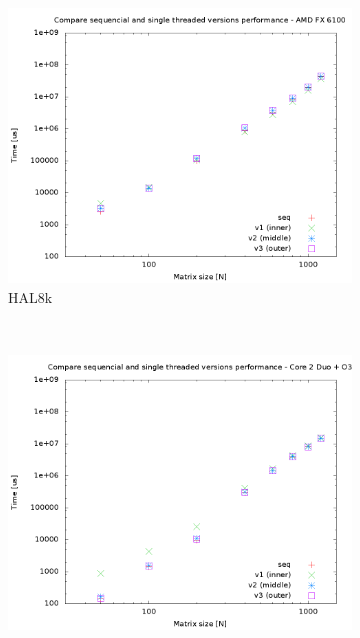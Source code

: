 \documentclass[a4paper, 12pt]{article}
\begin{document}
\begin{figure}[H]
    \centering
    \begin{subfigure}[H]{0.5\textwidth}
        \includegraphics[width=\textwidth]{cmp_single_thread_HAL}
        \caption{HAL8k}
        \label{fig:8k_cmp_single}
    \end{subfigure}%
    ~ %
    \begin{subfigure}[H]{0.5\textwidth}
        \includegraphics[width=\textwidth]{cmp_single_thread_hpops2_O3}

\end{subfigure}
\end{figure}
\end{document}
